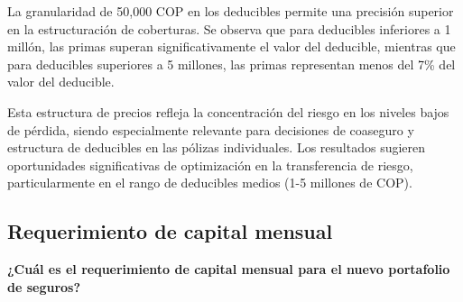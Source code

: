 La granularidad de 50,000 COP en los deducibles permite una precisión superior en la estructuración de coberturas. Se observa que para deducibles inferiores a 1 millón, las primas superan significativamente el valor del deducible, mientras que para deducibles superiores a 5 millones, las primas representan menos del 7\% del valor del deducible.

Esta estructura de precios refleja la concentración del riesgo en los niveles bajos de pérdida, siendo especialmente relevante para decisiones de coaseguro y estructura de deducibles en las pólizas individuales. Los resultados sugieren oportunidades significativas de optimización en la transferencia de riesgo, particularmente en el rango de deducibles medios (1-5 millones de COP).



\subsection{Requerimiento de capital mensual}

\textbf{¿Cuál es el requerimiento de capital mensual para el nuevo portafolio de seguros?}

